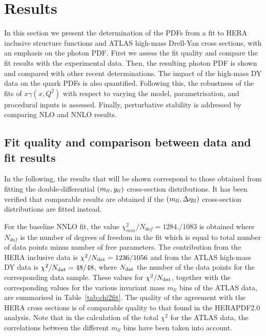 \section{Results}
\label{sec:results}

In this section we present the
determination of the PDFs from a fit to 
HERA inclusive structure functions and ATLAS high-mass Drell-Yan cross sections,
with an emphasis on the photon PDF.
%
First we assess the fit quality and compare the fit results
with the experimental data.
%
Then, the resulting photon PDF is shown and compared with other
recent determinations.
%
The impact of the high-mass DY data on
the quark PDFs is also quantified.
%
Following this,
the robustness of the fits of $x\gamma(x,Q^2)$
with respect to varying the model, parametrisation, and procedural
inputs is assessed.
%
Finally, perturbative stability is addressed by comparing NLO and
NNLO results.

\subsection{Fit quality and comparison between data and fit results}

In the following, the results that will be shown
correspond to those obtained from fitting the
double-differential $\left( m_{ll},y_{ll}\right)$ cross-section distributions.
%
It has been verified that comparable results are obtained if the
$\left( m_{ll},\Delta\eta_{ll}\right)$ cross-section distributions are fitted instead.

For the baseline NNLO fit, the value $\chi^2_{min}/N_{dof} =
1284./1083$ is obtained where $N_{dof}$ is the number of degrees of
freedom in the fit which is equal to total number of data points minus
number of free parameters.
%
The contribution from the HERA inclusive  data is 
$\chi^{2}/N_{\rm dat} = 1236/1056$ and
from the ATLAS high-mass DY data is $\chi^2/N_{\rm dat} = 48/48$,
where  $N_{\rm dat}$ the number of the data points for the corresponding
data sample.
%
These values for  $\chi^{2}/N_{\rm dat}$, together
with the corresponding values for the various
invariant mass $m_{ll}$ bins of the ATLAS  data,
are summarised in
Table~\ref{tab:chi2fit}.
%
The quality of the agreement with the HERA cross sections is of comparable quality to that found in the HERAPDF2.0 analysis.
%
Note that in the calculation of the total $\chi^2$ for the
ATLAS data, the correlations between the
different $m_{ll}$ bins have been taken into account.

